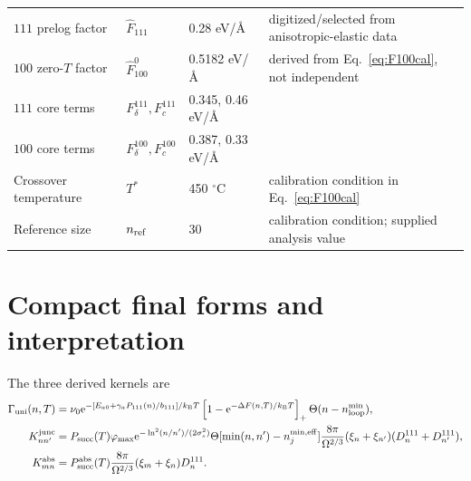 \documentclass[11pt,a4paper]{article}
\newcommand{\kb}{k_{\mathrm B}}
\newcommand{\pos}[1]{\left[#1\right]_{+}}
\newcommand{\e}{\mathrm e}
\begin{document}
\begin{table}[p]
\begin{tabular}{p{3.6cm}p{2.5cm}p{2.0cm}p{6.4cm}}
$111$ prelog factor & $\widehat F_{111}$ & 0.28 eV/\AA & digitized/selected from anisotropic-elastic data \\
$100$ zero-$T$ factor & $\widehat F_{100}^{0}$ & 0.5182 eV/\AA & derived from Eq.~\eqref{eq:F100cal}, not independent \\
$111$ core terms & $F_\delta^{111},F_c^{111}$ & 0.345, 0.46 eV/\AA & \citet{DudarevBullough2008} \\
$100$ core terms & $F_\delta^{100},F_c^{100}$ & 0.387, 0.33 eV/\AA & \citet{DudarevBullough2008} \\
Crossover temperature & $T^*$ & 450 $^\circ$C & calibration condition in Eq.~\eqref{eq:F100cal} \\
Reference size & $n_{\rm ref}$ & 30 & calibration condition; supplied analysis value \\
\bottomrule
\end{tabular}
\end{table}

\section{Compact final forms and interpretation}
\label{sec:summary}

The three derived kernels are
\begin{align}
 \Gamma_{\rm uni}(n,T)
 &=\nu_0\e^{-[E_{a0}+\gamma_aP_{111}(n)/b_{111}]/\kb T}
 \pos{1-\e^{-\Delta F(n,T)/\kb T}}
 \Theta(n-n_{\rm loop}^{\min}),                                      \label{eq:final1}\\
 K_{nn'}^{\rm junc}
 &=P_{\rm succ}(T)\varphi_{\max}
 \e^{-\ln^2(n/n')/(2\sigma_s^2)}
 \Theta[\min(n,n')-n_j^{\min,\rm eff}]
 \frac{8\pi}{\Omega^{2/3}}(\xi_n+\xi_{n'})(D_n^{111}+D_{n'}^{111}),  \label{eq:final2}\\
 K_{mn}^{\rm abs}
 &=P_{\rm succ}^{\rm abs}(T)
 \frac{8\pi}{\Omega^{2/3}}(\xi_m+\xi_n)D_n^{111}.                   \label{eq:final3}
\end{align}
\end{document}
